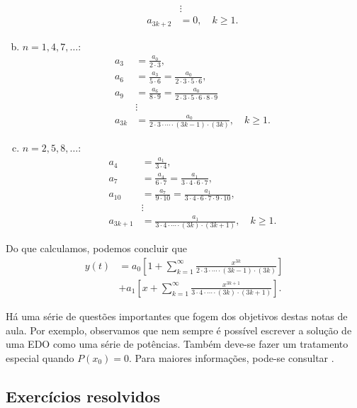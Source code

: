 \begin{ex}
\begin{enumerate}[a)]
\begin{align}
      &\vdots \\
      a_{3k+2} &= 0,\quad k\geq 1.
    \end{align}
  \item $n = 1, 4, 7, \ldots$:
    \begin{align}
      a_3 &= \frac{a_0}{2\cdot 3}, \\
      a_6 &= \frac{a_3}{5\cdot 6} = \frac{a_0}{2\cdot 3\cdot 5\cdot 6}, \\
      a_9 &= \frac{a_{6}}{8\cdot 9} = \frac{a_0}{2\cdot 3\cdot 5\cdot 6 \cdot 8 \cdot 9} \\
      &\vdots \\
      a_{3k} &= \frac{a_0}{2\cdot 3 \cdot\cdots\cdot (3k-1)\cdot (3k)},\quad k\geq 1.
    \end{align}
  \item $n = 2, 5, 8, \ldots$:
    \begin{align}
      a_4 &= \frac{a_1}{3\cdot 4}, \\
      a_7 &= \frac{a_4}{6\cdot 7} = \frac{a_1}{3\cdot 4 \cdot 6 \cdot 7},\\
      a_{10} &= \frac{a_{7}}{9\cdot 10} = \frac{a_1}{3\cdot 4 \cdot 6 \cdot 7\cdot 9 \cdot 10},\\
      &\vdots \\
      a_{3k+1} &= \frac{a_1}{3\cdot 4 \cdot\cdots\cdot (3k)\cdot (3k+1)},\quad k\geq 1.
    \end{align}
  \end{enumerate}
  Do que calculamos, podemos concluir que
  \begin{align}
    y(t) &= a_0\left[1 + \sum_{k=1}^\infty \frac{x^{3k}}{2\cdot 3 \cdot\cdots\cdot (3k-1)\cdot (3k)}\right] \\
    &+ a_1\left[x + \sum_{k=1}^\infty \frac{x^{3k+1}}{3\cdot 4 \cdot\cdots\cdot (3k)\cdot (3k+1)}\right].
  \end{align}
\end{ex}

Há uma série de questões importantes que fogem dos objetivos destas notas de aula. Por exemplo, observamos que nem sempre é possível escrever a solução de uma EDO como uma série de potências. Também deve-se fazer um tratamento especial quando $P(x_0)=0$. Para maiores informações, pode-se consultar \cite{Boyce2017}.

\subsection*{Exercícios resolvidos}


